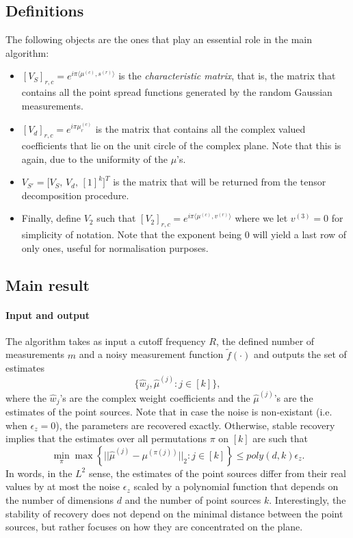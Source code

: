 \subsection{Definitions}
The following objects are the ones that play an essential role in the main algorithm:
\begin{itemize}
    \item $[V_S]_{r,c}=e^{i\pi\langle\mu^{(c)},s^{(r)}\rangle}$ is the \textit{characteristic matrix}, that is, the matrix that contains all the point spread functions generated by the random Gaussian measurements.
    \item $[V_d]_{r,c}=e^{i\pi\mu_r^{(c)}}$ is the matrix that contains all the complex valued coefficients that lie on the unit circle of the complex plane. Note that this is again, due to the uniformity of the $\mu$'s.
    \item $V_{S'}=\big[V_S,\, V_d,\, [1]^k\big]^T$ is the matrix that will be returned from the tensor decomposition procedure.
    \item Finally, define $V_2$ such that $[V_2]_{r,c}=e^{i\pi\langle\mu^{(c)},v^{(r)}\rangle}$ where we let $v^{(3)}=0$ for simplicity of notation. Note that the exponent being 0 will yield a last row of only ones, useful for normalisation purposes.
\end{itemize}
\subsection{Main result}
\paragraph{Input and output} The algorithm takes as input a cutoff frequency $R$, the defined number of measurements $m$ and a noisy measurement function $\widetilde{f}(\cdot)$ and outputs the set of estimates $$\{\widehat{w}_j,\widehat{\mu}^{(j)}:j\in[k]\},$$ where the $\widehat{w}_j$'s are the complex weight coefficients and the $\widehat{\mu}^{(j)}$'s are the estimates of the point sources. Note that in case the noise is non-existant (i.e. when $\epsilon_z=0$), the parameters are recovered exactly. Otherwise, stable recovery implies that the estimates over all permutations $\pi$ on $[k]$ are such that $$\min_\pi\max\left\{||\widehat{\mu}^{(j)}-\mu^{(\pi(j))}||_2:j\in[k]\right\}\leq poly(d,k)\epsilon_z.$$ In words, in the $L^2$ sense, the estimates of the point sources differ from their real values by at most the noise $\epsilon_z$ scaled by a polynomial function that depends on the number of dimensions $d$ and the number of point sources $k$. Interestingly, the stability of recovery does not depend on the minimal distance between the point sources, but rather focuses on how they are concentrated on the plane.
